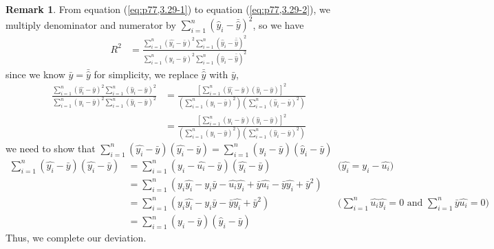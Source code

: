 \documentclass[a4paper, 10pt]{article}
\theoremstyle{definition}	%
\newtheorem*{remark}{Remark}
\begin{document}
\begin{remark}
    From equation (\ref{eq:p77,3.29-1}) to equation (\ref{eq:p77,3.29-2}), we multiply denominator and numerator by 
    $\sum_{i=1}^{n} (\hat{y}_i - \bar{\hat{y}})^2$, so we have
    \begin{align*}
        R^2 &= \frac{\sum_{i=1}^{n}(\hat{y_i}-\bar{y})^2 \sum_{i=1}^{n} (\hat{y}_i - \bar{\hat{y}})^2}{\sum_{i=1}^{n}(y_i-\bar{y})^2 \sum_{i=1}^{n} (\hat{y}_i - \bar{\hat{y}})^2}
    \end{align*}
    since we know $\bar{y} = \bar{\hat{y}}$ for simplicity, we replace $\bar{\hat{y}}$ with $\bar{y}$,
    \begin{align*}
    \frac{\sum_{i=1}^{n}(\hat{y_i}-\bar{y})^2 \sum_{i=1}^{n} (\hat{y}_i - \bar{y})^2}{\sum_{i=1}^{n}(y_i-\bar{y})^2 \sum_{i=1}^{n} (\hat{y}_i - \bar{y})^2} 
    &= \frac{\left[ \sum_{i=1}^{n} (\hat{y_i} - \bar{y})(\hat{y}_i - \bar{y}) \right]^2}{\left( \sum_{i=1}^{n} (y_i - \bar{y})^2 \right) \left( \sum_{i=1}^{n} (\hat{y}_i - \bar{y})^2 \right)}\\
    &= \frac{\left[ \sum_{i=1}^{n} (y_i - \bar{y})(\hat{y}_i - \bar{y}) \right]^2}{\left( \sum_{i=1}^{n} (y_i - \bar{y})^2 \right) \left( \sum_{i=1}^{n} (\hat{y}_i - \bar{y})^2 \right)}
    \end{align*}
    we need to show that $\sum_{i=1}^{n}(\hat{y_i}-\bar{y})(\hat{y_i}-\bar{y}) = \sum_{i=1}^{n} (y_i - \bar{y})(\hat{y}_i - \bar{y})$
    \begin{align*}
        \sum_{i=1}^{n}(\hat{y_i}-\bar{y})(\hat{y_i}-\bar{y}) &= \sum_{i=1}^{n}(y_i-\hat{u_i}-\bar{y})(\hat{y_i}-\bar{y}) 
        && \text{($\hat{y_i} = y_i-\hat{u_i}$)}\\
        &= \sum_{i=1}^{n}(y_i\hat{y_i}-y_i\bar{y}-\hat{u_i}\hat{y_i}+\bar{y}\hat{u_i}-\bar{y}\hat{y_i}+\bar{y}^2)\\
        &= \sum_{i=1}^{n}(y_i\hat{y_i}-y_i\bar{y}-\bar{y}\hat{y_i}+\bar{y}^2)
        && \text{($\sum_{i=1}^{n}\hat{u_i}\hat{y_i} = 0$ and $\sum_{i=1}^{n}\bar{y}\hat{u_i} = 0$)}\\
        &= \sum_{i=1}^{n} (y_i - \bar{y})(\hat{y}_i - \bar{y})
    \end{align*}
    Thus, we complete our deviation.
\end{remark}
\end{document}
